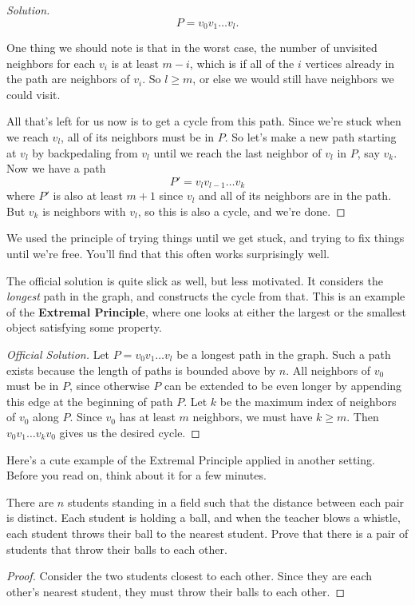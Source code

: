 \documentclass[11 pt]{scrartcl}
\begin{document}
\begin{proof}[Solution]
\[ P = v_0v_1\dots v_l.\] 

One thing we should note is that in the worst case, the number of unvisited neighbors for each $v_i$ is at least $m-i$, which is if all of the $i$ vertices already in the path are neighbors of $v_i$. 
So $l \geq m$, or else we would still have neighbors we could visit.  

All that's left for us now is to get a cycle from this path. Since we're stuck when we reach $v_l$, all of its neighbors must be in $P$. So let's make a new path starting at $v_l$ by backpedaling from $v_l$ until we reach the last neighbor of $v_l$ in $P$, say $v_k$. Now we have a path 
\[ P' = v_l v_{l-1} \dots v_k\] 
where $P'$ is also at least $m+1$ since $v_l$ and all of its neighbors are in the path. But $v_k$ is neighbors with $v_l$, so this is also a cycle, and we're done.  
\end{proof}

We used the principle of trying things until we get stuck, and trying to fix things until we're free. You'll find that this often works surprisingly well. 

The official solution is quite slick as well, but less motivated.
It considers the \emph{longest} path in the graph, and constructs the cycle from that. 
This is an example of the \textbf{Extremal Principle}, where one looks at either the largest or the smallest object satisfying some property. 

\begin{proof}[Official Solution]
    Let $P=v_0v_1\dots v_l$ be a longest path in the graph. 
    Such a path exists because the length of paths is bounded above by $n$.  
    All neighbors of $v_0$ must be in $P$, since otherwise $P$ can be extended to be even longer by appending this edge at the beginning of path $P$.  
    Let $k$ be the maximum index of neighbors of $v_0$ along $P$. 
    Since $v_0$ has at least $m$ neighbors, we must have $k\geq m$. 
    Then $v_0v_1\dots v_kv_0$ gives us the desired cycle.
\end{proof}


Here's a cute example of the Extremal Principle applied in another setting. Before you read on, think about it for a few minutes.  

\begin{problem}
    There are $n$ students standing in a field such that the distance between each pair is distinct. Each student is holding a ball, and when the teacher blows a whistle, each student throws their ball to the nearest student. Prove that there is a pair of students that throw their balls to each other.
\end{problem}
\begin{proof}
    Consider the two students closest to each other. Since they are each other's nearest student, they must throw their balls to each other. 
\end{proof}
\end{document}
